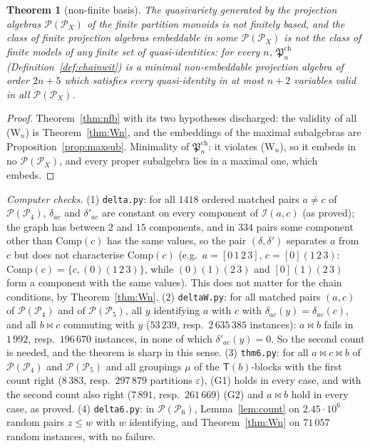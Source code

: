 \documentclass[11pt]{amsart}
\newtheorem{theorem}{Theorem}[section]
\theoremstyle{definition}
\renewcommand{\P}{\mathcal{P}}
\newcommand{\T}{\mathsf{T}}
\newcommand{\mt}{\bowtie}   %
\begin{document}
\begin{theorem}[non-finite basis]\label{thm:nfbW}
The quasivariety generated by the projection algebras $\P(\P_X)$ of the finite partition monoids is not finitely based, and the class of finite projection algebras embeddable in some $\P(\P_X)$ is not the class of finite models of any finite set of quasi-identities: for every $n$, $\mathfrak P^{\mathrm{ch}}_n$ (Definition~\ref{def:chainwit}) is a minimal non-embeddable projection algebra of order $2n+5$ which satisfies every quasi-identity in at most $n+2$ variables valid in all $\P(\P_X)$.
\end{theorem}

\begin{proof}
Theorem~\ref{thm:nfb} with its two hypotheses discharged: the validity of all (W$_n$) is Theorem~\ref{thm:Wn}, and the embeddings of the maximal subalgebras are Proposition~\ref{prop:maxsub}. Minimality of $\mathfrak P^{\mathrm{ch}}_n$: it violates (W$_n$), so it embeds in no $\P(\P_X)$, and every proper subalgebra lies in a maximal one, which embeds.
\end{proof}

\emph{Computer checks.} (1) \texttt{delta.py}: for all $1418$ ordered matched pairs $a\ne c$ of $\P(\P_4)$, $\delta_{ac}$ and $\delta'_{ac}$ are constant on every component of $\mathcal I(a,c)$ (as proved); the graph has between $2$ and $15$ components, and in $334$ pairs some component other than $\mathrm{Comp}(c)$ has the same values, so the pair $(\delta,\delta')$ separates $a$ from $c$ but does not characterise $\mathrm{Comp}(c)$ (e.g.\ $a=[0\,1\,2\,3]$, $c=[0](1\,2\,3)$: $\mathrm{Comp}(c)=\{c,(0)(1\,2\,3)\}$, while $(0)(1)(2\,3)$ and $[0](1)(2\,3)$ form a component with the same values). This does not matter for the chain conditions, by Theorem~\ref{thm:Wn}. (2) \texttt{deltaW.py}: for all matched pairs $(a,c)$ of $\P(\P_4)$ and of $\P(\P_5)$, all $y$ identifying $a$ with $c$ with $\delta_{ac}(y)=\delta_{ac}(c)$, and all $b\mt c$ commuting with $y$ ($53\,239$, resp.\ $2\,635\,385$ instances): $a\mt b$ fails in $1\,992$, resp.\ $196\,670$ instances, in none of which $\delta'_{ac}(y)=0$. So the second count is needed, and the theorem is sharp in this sense. (3) \texttt{thm6.py}: for all $a\mt c\mt b$ of $\P(\P_4)$ and $\P(\P_5)$ and all groupings $\mu$ of the $\T(b)$-blocks with the first count right ($8\,383$, resp.\ $297\,879$ partitions $\varepsilon$), (G1) holds in every case, and with the second count also right ($7\,891$, resp.\ $261\,669$) (G2) and $a\mt b$ hold in every case, as proved. (4) \texttt{delta6.py}: in $\P(\P_6)$, Lemma~\ref{lem:count} on $2.45\cdot10^6$ random pairs $z\le w$ with $w$ identifying, and Theorem~\ref{thm:Wn} on $71\,057$ random instances, with no failure.
\end{document}
